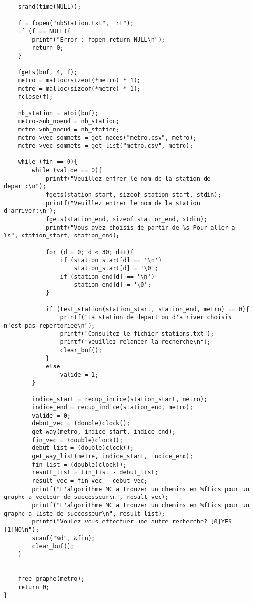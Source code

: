 \documentclass[12pt, twoside]{report}
\begin{document}
\begin{verbatim}
	srand(time(NULL));

	f = fopen("nbStation.txt", "rt");
	if (f == NULL){
		printf("Error : fopen return NULL\n");
		return 0;
	}

	fgets(buf, 4, f);
	metro = malloc(sizeof(*metro) * 1);
	metre = malloc(sizeof(*metre) * 1);
	fclose(f);

	nb_station = atoi(buf);
	metro->nb_noeud = nb_station;
	metre->nb_noeud = nb_station;
	metro->vec_sommets = get_nodes("metro.csv", metro);
	metre->vec_sommets = get_list("metro.csv", metro);

	while (fin == 0){
		while (valide == 0){
			printf("Veuillez entrer le nom de la station de depart:\n");
			fgets(station_start, sizeof station_start, stdin);
			printf("Veuillez entrer le nom de la station d'arriver:\n");
			fgets(station_end, sizeof station_end, stdin);
			printf("Vous avez choisis de partir de %s Pour aller a %s", station_start, station_end);

			for (d = 0; d < 30; d++){
				if (station_start[d] == '\n')
					station_start[d] = '\0';
				if (station_end[d] == '\n')
					station_end[d] = '\0';
			}

			if (test_station(station_start, station_end, metro) == 0){
				printf("La station de depart ou d'arriver choisis n'est pas repertoriee\n");
				printf("Consultez le fichier stations.txt");
				printf("Veuillez relancer la recherche\n");
				clear_buf();
			}
			else
				valide = 1;
		}

		indice_start = recup_indice(station_start, metro);
		indice_end = recup_indice(station_end, metro);
		valide = 0;
		debut_vec = (double)clock();
		get_way(metro, indice_start, indice_end);
		fin_vec = (double)clock();
		debut_list = (double)clock();
		get_way_list(metre, indice_start, indice_end);
		fin_list = (double)clock();
		result_list = fin_list - debut_list;
		result_vec = fin_vec - debut_vec;
		printf("L'algorithme MC a trouver un chemins en %ftics pour un graphe a vecteur de successeur\n", result_vec);
		printf("L'algorithme MC a trouver un chemins en %ftics pour un graphe a liste de successeur\n", result_list);
		printf("Voulez-vous effectuer une autre recherche? [0]YES [1]NO\n");
		scanf("%d", &fin);
		clear_buf();
	}


	free_graphe(metro);
	return 0;
}
\end{verbatim}
\end{document}

